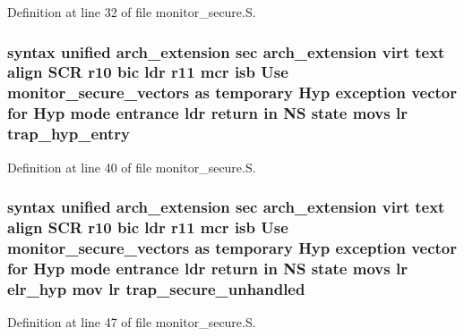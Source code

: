 \-Definition at line 32 of file monitor\-\_\-secure.\-S.

\hypertarget{monitor__secure_8_s_a6d2d563d2b5c45de176f478b60b4111e}{
\subsubsection[{trap\-\_\-hyp\-\_\-entry}]{\setlength{\rightskip}{0pt plus 5cm}syntax unified arch\-\_\-extension sec arch\-\_\-extension virt text align \-S\-C\-R {\bf r10} bic ldr {\bf r11} mcr {\bf isb} \-Use {\bf monitor\-\_\-secure\-\_\-vectors} as temporary \-Hyp exception vector for \-Hyp mode entrance ldr {\bf return} in \-N\-S state movs {\bf lr} {\bf trap\-\_\-hyp\-\_\-entry}}}\label{monitor__secure_8_s_a6d2d563d2b5c45de176f478b60b4111e}


\-Definition at line 40 of file monitor\-\_\-secure.\-S.

\hypertarget{monitor__secure_8_s_ac8b690ca33483cbcbeccd0541a1b8edd}{
\subsubsection[{trap\-\_\-secure\-\_\-unhandled}]{\setlength{\rightskip}{0pt plus 5cm}syntax unified arch\-\_\-extension sec arch\-\_\-extension virt text align \-S\-C\-R {\bf r10} bic ldr {\bf r11} mcr {\bf isb} \-Use {\bf monitor\-\_\-secure\-\_\-vectors} as temporary \-Hyp exception vector for \-Hyp mode entrance ldr {\bf return} in \-N\-S state movs {\bf lr} {\bf elr\-\_\-hyp} mov {\bf lr} {\bf trap\-\_\-secure\-\_\-unhandled}}}\label{monitor__secure_8_s_ac8b690ca33483cbcbeccd0541a1b8edd}


\-Definition at line 47 of file monitor\-\_\-secure.\-S.

